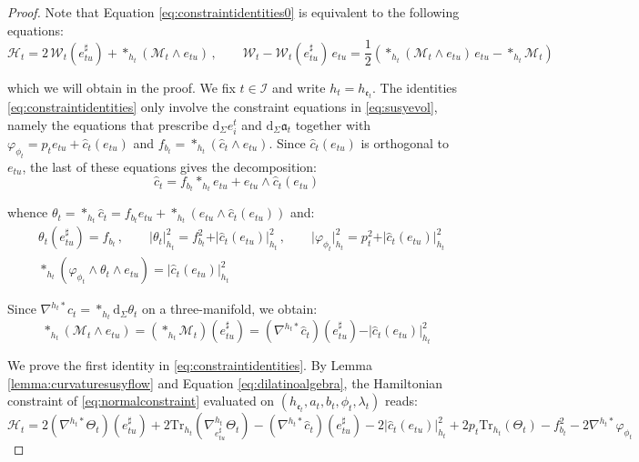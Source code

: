 \documentclass[10pt,reqno,a4paper]{amsart}
\theoremstyle{plain}
\theoremstyle{definition}
\theoremstyle{remark}
\theoremstyle{remark}
\def\dd{\mathrm{d}}
\newcommand{\Tr}{\mathrm{Tr}}
\def\cH{\mathcal{H}}
\def\cI{\mathcal{I}}
\def\cM{\mathcal{M}}
\def\cW{\mathcal{W}}
\def\cH{\mathcal{H}}
\def\fra{\mathfrak{a}}
\def\fre{\mathfrak{e}}
\renewcommand{\(}{ (}
\renewcommand{\)}{ )}
\begin{document}
\begin{proof}
Note that Equation \eqref{eq:constraintidentities0} is equivalent to the following equations:
\begin{equation}
\label{eq:constraintidentities}
\cH_t = 2\, \cW_t(e^{\sharp}_{tu}) + \ast_{h_t} (\cM_t\wedge e_{tu})\, , \qquad \cW_t - \cW_t(e^{\sharp}_{tu})\, e_{tu} =  \frac{1}{2} ( \ast_{h_t} (\cM_t\wedge e_{tu})\, e_{tu} - \ast_{h_t}\cM_t )
\end{equation}

\noindent
which we will obtain in the proof. We fix $t\in \cI$ and write $h_t = h_{\fre_t}$. The identities \eqref{eq:constraintidentities} only involve the constraint equations in \eqref{eq:susyevol}, namely the equations that prescribe $\dd_{\Sigma} e^t_i$ and $\dd_{\Sigma}\fra_t$ together with $\varphi_{\phi_t}=p_t e_{tu}+\widehat{c}_t(e_{tu})$ and $f_{b_t}=\ast_{h_t}(\widehat{c}_t\wedge e_{tu})$. Since $\widehat{c}_t (e_{tu})$ is orthogonal to $e_{tu}$, the last of these equations gives the decomposition:
\begin{equation*}
\widehat{c}_t  = f_{b_t} \ast_{h_t} e_{tu} + e_{tu}\wedge \widehat{c}_t (e_{tu})    
\end{equation*}

\noindent
whence $\theta_t = \ast_{h_t}\widehat{c}_t  = f_{b_t} e_{tu} + \ast_{h_t}(e_{tu}\wedge\widehat{c}_t (e_{tu}))$ and:
\begin{eqnarray}
\label{eq:dilatinoalgebra}
& \theta_t(e^{\sharp}_{tu}) = f_{b_t}\, , \qquad \vert\theta_t\vert^2_{h_t} = f_{b_t}^2 + \vert \widehat{c}_t (e_{tu})\vert^2_{h_t}\, , \qquad \vert\varphi_{\phi_t}\vert^2_{h_t} = p_t^2 + \vert \widehat{c}_t (e_{tu})\vert^2_{h_t} \nonumber \\
& \ast_{h_t}(\varphi_{\phi_t}\wedge\theta_t\wedge e_{tu}) = \vert \widehat{c}_t (e_{tu})\vert^2_{h_t}
\end{eqnarray}

\noindent
Since $\nabla^{h_t\ast}\widehat{c}_t  = \ast_{h_t}\dd_{\Sigma}\theta_t$ on a three-manifold, we obtain:
\begin{equation}
\label{eq:Maxwellnormalcomponent}
\ast_{h_t}(\cM_t\wedge e_{tu}) = (\ast_{h_t}\cM_t)(e^{\sharp}_{tu}) = (\nabla^{h_t\ast}\widehat{c}_t )(e^{\sharp}_{tu}) - \vert \widehat{c}_t (e_{tu})\vert^2_{h_t}
\end{equation}

\noindent
We prove the first identity in \eqref{eq:constraintidentities}. By Lemma \ref{lemma:curvaturesusyflow} and Equation \eqref{eq:dilatinoalgebra}, the Hamiltonian constraint of \eqref{eq:normalconstraint} evaluated on $(h_{\fre_t}, a_t , b_t,\phi_t,\lambda_t)$ reads:
\begin{equation*}
\cH_t = 2(\nabla^{h_t\ast}\Theta_t)(e^{\sharp}_{tu}) + 2\Tr_{h_t}(\nabla^{h_t}_{e^{\sharp}_{tu}}\Theta_t) - (\nabla^{h_t\ast}\widehat{c}_t )(e^{\sharp}_{tu}) - 2\vert \widehat{c}_t (e_{tu})\vert^2_{h_t} + 2 p_t \Tr_{h_t}(\Theta_t) - f_{b_t}^2 - 2\nabla^{h_t\ast}\varphi_{\phi_t}
\end{equation*}


\end{proof}
\end{document}
